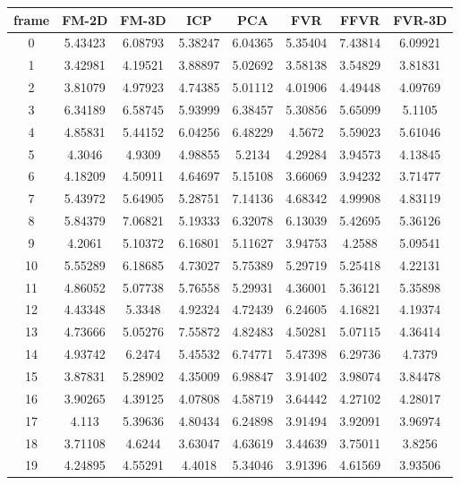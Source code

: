 
\begin{figure}
\centering
\begin{tabular}{cccccccc}
\hline
\textbf{frame} & \textbf{FM-2D} & \textbf{FM-3D} & \textbf{ICP} & \textbf{PCA} & \textbf{FVR} & \textbf{FFVR} & \textbf{FVR-3D}
\\ \hline
0 & 5.43423 & 6.08793 & 5.38247 & 6.04365 & 5.35404 & 7.43814 & 6.09921\\
1 & 3.42981 & 4.19521 & 3.88897 & 5.02692 & 3.58138 & 3.54829 & 3.81831\\
2 & 3.81079 & 4.97923 & 4.74385 & 5.01112 & 4.01906 & 4.49448 & 4.09769\\
3 & 6.34189 & 6.58745 & 5.93999 & 6.38457 & 5.30856 & 5.65099 & 5.1105\\
4 & 4.85831 & 5.44152 & 6.04256 & 6.48229 & 4.5672 & 5.59023 & 5.61046\\
5 & 4.3046 & 4.9309 & 4.98855 & 5.2134 & 4.29284 & 3.94573 & 4.13845\\
6 & 4.18209 & 4.50911 & 4.64697 & 5.15108 & 3.66069 & 3.94232 & 3.71477\\
7 & 5.43972 & 5.64905 & 5.28751 & 7.14136 & 4.68342 & 4.99908 & 4.83119\\
8 & 5.84379 & 7.06821 & 5.19333 & 6.32078 & 6.13039 & 5.42695 & 5.36126\\
9 & 4.2061 & 5.10372 & 6.16801 & 5.11627 & 3.94753 & 4.2588 & 5.09541\\
10 & 5.55289 & 6.18685 & 4.73027 & 5.75389 & 5.29719 & 5.25418 & 4.22131\\
11 & 4.86052 & 5.07738 & 5.76558 & 5.29931 & 4.36001 & 5.36121 & 5.35898\\
12 & 4.43348 & 5.3348 & 4.92324 & 4.72439 & 6.24605 & 4.16821 & 4.19374\\
13 & 4.73666 & 5.05276 & 7.55872 & 4.82483 & 4.50281 & 5.07115 & 4.36414\\
14 & 4.93742 & 6.2474 & 5.45532 & 6.74771 & 5.47398 & 6.29736 & 4.7379\\
15 & 3.87831 & 5.28902 & 4.35009 & 6.98847 & 3.91402 & 3.98074 & 3.84478\\
16 & 3.90265 & 4.39125 & 4.07808 & 4.58719 & 3.64442 & 4.27102 & 4.28017\\
17 & 4.113 & 5.39636 & 4.80434 & 6.24898 & 3.91494 & 3.92091 & 3.96974\\
18 & 3.71108 & 4.6244 & 3.63047 & 4.63619 & 3.44639 & 3.75011 & 3.8256\\
19 & 4.24895 & 4.55291 & 4.4018 & 5.34046 & 3.91396 & 4.61569 & 3.93506\\

\end{tabular}
\end{figure}
